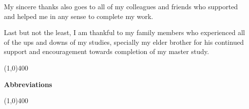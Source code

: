 \documentclass{report}
\newcommand{\Hline}{\par
  \begin{center}
   \line(1,0){400}
   \end{center}
}
\begin{document}
\noindent My sincere thanks also goes to all of my colleagues and friends who supported and helped me in any sense to complete my work.\vspace{5 mm}


\noindent Last but not the least, I am thankful to my family members who experienced all of the ups and downs of my studies, specially my elder brother for his continued support and encouragement towards completion of my master study.



\newpage
\tableofcontents
\listoffigures
\listoftables

\newpage
{}
\Hline
\begin{center}{\huge\bf Abbreviations\par}\end{center}
\Hline
\vspace{10mm}
\null
\end{document}
